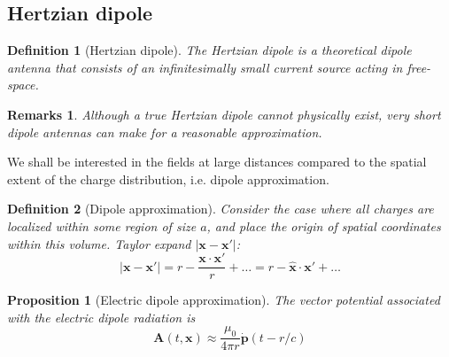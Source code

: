 \documentclass[a4paper]{article}
\newtheorem{remarks}{Remarks}[section]
\theoremstyle{new}
\newtheorem{defi}{Definition}[section]
\newtheorem{prop}{Proposition}[section]
\begin{document}
\subsection{Hertzian dipole}
\begin{defi}[Hertzian dipole]
The Hertzian dipole is a theoretical dipole antenna that consists of an infinitesimally small current source acting in free-space. 
\end{defi}
\begin{remarks}
Although a true Hertzian dipole cannot physically exist, very short dipole antennas can make for a reasonable approximation.
\end{remarks}
We shall be interested in the fields at large distances compared to the spatial extent of the charge distribution, i.e. dipole approximation.
\begin{defi}[Dipole approximation]
Consider the case where all charges are localized within some region of size $a$, and place the origin of spatial coordinates within this volume. Taylor expand $|\mathbf{x}-\mathbf{x'}|$:
$$|\mathbf{x}-\mathbf{x'}|=r-\frac{\mathbf{x}\cdot\mathbf{x'}}{r}+\dots=r-\mathbf{\hat{x}}\cdot\mathbf{x'}+\dots$$
\end{defi}
\begin{prop}[Electric dipole approximation]
The vector potential associated with the electric dipole radiation is
$$\mathbf{A}(t,\mathbf{x})\approx\frac{\mu_0}{4\pi r}\mathbf{\dot{p}}(t-r/c)$$
\end{prop}
\end{document}
